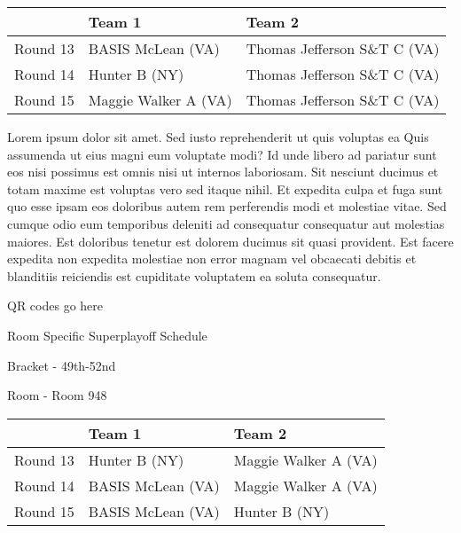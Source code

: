 \documentclass{article}%
\begin{document}
%
\begin{tabularx}{\textwidth}{|c|Y|Y|}%
\hline%
&Team 1&Team 2\\%
\hline%
Round 13&BASIS McLean (VA)&Thomas Jefferson S\&T C (VA)\\%
Round 14&Hunter B (NY)&Thomas Jefferson S\&T C (VA)\\%
Round 15&Maggie Walker A (VA)&Thomas Jefferson S\&T C (VA)\\%
\hline%
\end{tabularx}%
\vspace*{8pt}%
\newline%
Lorem ipsum dolor sit amet. Sed iusto reprehenderit ut quis voluptas ea Quis assumenda ut eius magni eum voluptate modi? Id unde libero ad pariatur sunt eos nisi possimus est omnis nisi ut internos laboriosam. Sit nesciunt ducimus et totam maxime est voluptas vero sed itaque nihil. Et expedita culpa et fuga sunt quo esse ipsam eos doloribus autem rem perferendis modi et molestiae vitae.\newline%
\newline%
Sed cumque odio eum temporibus deleniti ad consequatur consequatur aut molestias maiores. Est doloribus tenetur est dolorem ducimus sit quasi provident. Est facere expedita non expedita molestiae non error magnam vel obcaecati debitis et blanditiis reiciendis est cupiditate voluptatem ea soluta consequatur.%
\vspace*{140pt}%
\begin{center}%
\begin{Huge}%
QR codes go here%
\end{Huge}%
\end{center}%
\newpage%
\begin{center}%
\begin{Huge}%
Room Specific Superplayoff Schedule%
\end{Huge}%
\vspace*{8pt}%
\linebreak%
\begin{Large}%
Bracket {-} 49th{-}52nd%
\end{Large}%
\vspace*{8pt}%
\linebreak%
\vspace*{8pt}%
\begin{Large}%
Room {-} Room 948%
\end{Large}%
\end{center}%
%
\begin{tabularx}{\textwidth}{|c|Y|Y|}%
\hline%
&Team 1&Team 2\\%
\hline%
Round 13&Hunter B (NY)&Maggie Walker A (VA)\\%
Round 14&BASIS McLean (VA)&Maggie Walker A (VA)\\%
Round 15&BASIS McLean (VA)&Hunter B (NY)\\%
\hline%
\end{tabularx}%
\end{document}
